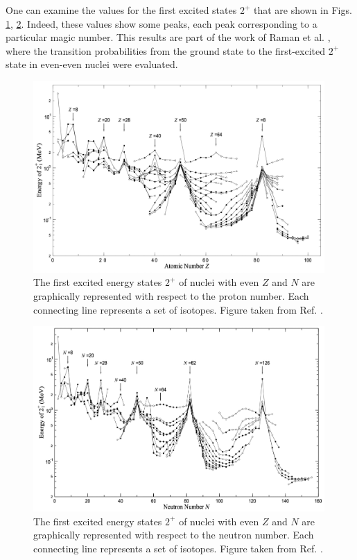 One can examine the values for the first excited states $2^+$ that are shown in Figs. \ref{e2plus_proton}, \ref{e2plus_neutron}. Indeed, these values show some peaks, each peak corresponding to a particular magic number. This results are part of the work of Raman et al. \cite{raman2001transition}, where the transition probabilities from the ground state to the first-excited $2^+$ state in even-even nuclei were evaluated.

\begin{figure}
    \centering
    \includegraphics[width=0.99\textwidth]{Chapters/Figures/E2plus_proton.pdf}
    \caption{The first excited energy states $2^+$ of nuclei with even $Z$ and $N$ are graphically represented with respect to the proton number. Each connecting line represents a set of isotopes. Figure taken from Ref. \cite{matta2017exotic}.}
    \label{e2plus_proton}
\end{figure}

\begin{figure}
    \centering
    \includegraphics[width=0.99\textwidth]{Chapters/Figures/E2plus_neutron.pdf}
    \caption{The first excited energy states $2^+$ of nuclei with even $Z$ and $N$ are graphically represented with respect to the neutron number. Each connecting line represents a set of isotopes. Figure taken from Ref. \cite{matta2017exotic}.}
    \label{e2plus_neutron}
\end{figure}


